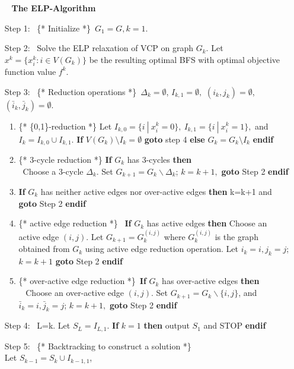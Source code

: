 \documentclass[12pt]{article}
\begin{document}
\vskip 10pt
\begin{itemize}
\item[~] {\large\bf The ELP-Algorithm}
\item[Step 1:~] \{* \textsf{Initialize} *\}\
$G_1=G, k=1$.
\item[Step 2:~] Solve the ELP relaxation of VCP on graph $G_k$. Let
$x^k=\{x_i^k : i\in V(G_k)\}$ be the resulting optimal BFS with
optimal objective function value $f^k$.
\item[Step 3:~] \{* \textsf{Reduction operations}
*\}\ $\Delta_k=\emptyset$, $I_{k,1}=\emptyset,$ $(i_k,j_k)=\emptyset$, $(\bar{i}_k, \bar{j}_k)=\emptyset$.
\begin{enumerate}
\item \{* \textsf{\{0,1\}-reduction} *\} Let $I_{k,0}=\{i\ | \ x_i^k=0\}, \
I_{k,1}=\{ i\ | \ x_i^k=1\}, $ and $I_k=I_{k,0}\cup I_{k,1}$.
\textbf{If} $V(G_k)\setminus I_{k}=\emptyset$ \textbf{goto}
step 4 \textbf{else}  $G_k=G_k\setminus I_k$ \textbf{endif}
\item \{* \textsf{3-cycle reduction} *\} \textbf{If} $G_k$ has 3-cycles \textbf{then} \\
     \mbox{ }Choose a 3-cycle $\Delta_k$. Set $G_{k+1}=G_k\backslash \Delta_k$;
     $k=k+1,$ \textbf{goto} Step 2 \textbf{endif}
\item \textbf{If} $G_k$ has neither active edges  nor over-active edges \textbf{then} k=k+1 and \textbf{goto} Step 2 \textbf{endif}
\item \{* \textsf{active edge reduction} *\} \ \textbf{If} $G_k$ has active edges \textbf{then}
 Choose an active
edge $(i,j)$. Let $G_{k+1}=G_k^{(i,j)}$ where $G_k^{(i,j)}$ is the
graph obtained from $G_k$ using  active edge reduction operation.
Let $i_k=i, j_k=j$; $k=k+1$
\textbf{goto} Step 2 \textbf{endif}
\item \{* \textsf{over-active edge reduction} *\}\ \textbf{If} $G_k$ has over-active edges \textbf{then} \\
     \mbox{ } Choose an over-active edge $(i, j)$. Set $G_{k+1}=G_k\backslash \{i,j\}$, and $\bar{i}_k=i, \bar{j}_k=j$;
     $k=k+1,$ \textbf{goto} Step 2 \textbf{endif}
\end{enumerate}
\item[Step 4:~] L=k.  Let $S_L=I_{L,1}$. \textbf{If} $k=1$ \textbf{then} output
$S_1$ and STOP \textbf{endif}
\item[Step 5:~] \{* \textsf{Backtracking to construct a solution} *\}\\
Let $S_{k-1}=S_{k}\cup I_{k-1,1}$,\\

\end{itemize}
\end{document}
